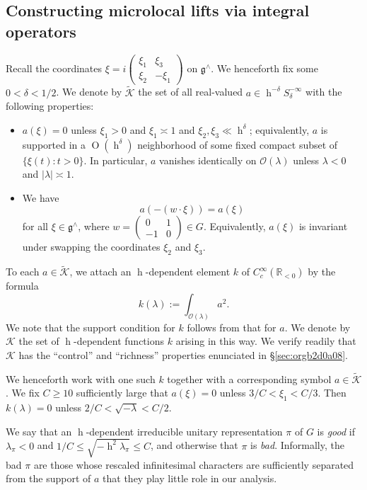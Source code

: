 \documentclass[reqno,10pt]{amsart}
\theoremstyle{plain} %
\theoremstyle{definition}
\theoremstyle{plain} %
\theoremstyle{remark}
\theoremstyle{itplain} %
\theoremstyle{remark} %
\renewcommand{\geq}{\geqslant}
\renewcommand{\leq}{\leqslant}
\numberwithin{equation}{section}
\def\O{\operatorname{O}}
\DeclareMathOperator{\h}{h}
\begin{document}
\subsection{Constructing microlocal lifts via integral operators}
\label{sec:org8bcf1bd}
Recall the coordinates $\xi = i \begin{pmatrix}
  \xi_1 & \xi_3 \\
  \xi_2 & - \xi_1
\end{pmatrix}$ on $\mathfrak{g}^\wedge$.  We henceforth fix some $0 < \delta < 1/2$.  We denote by $\tilde{\mathcal{K}}$ the set of all real-valued $a \in \h^{-\delta} S^{-\infty}_\delta$ with the following properties:
\begin{itemize}
\item $a (\xi) = 0$ unless $\xi_1 > 0$ and $\xi_1 \asymp 1$ and $\xi_2,\xi_3 \ll \h^\delta$; equivalently, $a$ is supported in a $\O(\h^\delta)$ neighborhood of some fixed compact subset of $\{\xi(t) : t > 0\}$.  In particular, $a$ vanishes identically on $\mathcal{O}(\lambda)$ unless $\lambda < 0$ and $|\lambda| \asymp 1$.
\item We have
  \begin{equation}\label{eq:Weyl-negates-symbol}
    a(-(w \cdot \xi)) = a(\xi)
  \end{equation}
  for all $\xi \in \mathfrak{g}^\wedge$, where $w = \begin{pmatrix} 0 & 1 \\ -1 & 0 \end{pmatrix} \in G$.  Equivalently, $a(\xi)$ is invariant under swapping the coordinates $\xi_2$ and $\xi_3$.
\end{itemize}

To each $a \in \tilde{\mathcal{K}}$, we attach an $\h$-dependent element $k$ of $C_c^\infty(\mathbb{R}_{<0})$ by the formula
\[
  k(\lambda) := \int_{\mathcal{O}(\lambda)} a^2.
\]
We note that the support condition for $k$ follows from that for $a$.  We denote by $\mathcal{K}$ the set of $\h$-dependent functions $k$ arising in this way.  We verify readily that $\mathcal{K}$ has the ``control'' and ``richness'' properties enunciated in \S\ref{sec:orgb2d0a08}.

We henceforth work with one such $k$ together with a corresponding symbol $a \in \tilde{\mathcal{K}}$.  We fix $C \geq 10$ sufficiently large that $a (\xi) = 0$ unless $3/C < \xi_1 < C/3$.  Then $k(\lambda) = 0$ unless $2/C < \sqrt{-\lambda} < C/2$.

We say that an $\h$-dependent irreducible unitary representation $\pi$ of $G$ is \emph{good} if $\lambda_\pi < 0$ and $1/C \leq \sqrt{-\h^2 \lambda_\pi} \leq C$, and otherwise that $\pi$ is \emph{bad}.  Informally, the bad $\pi$ are those whose rescaled infinitesimal characters are sufficiently separated from the support of $a$ that they play little role in our analysis.
\end{document}

